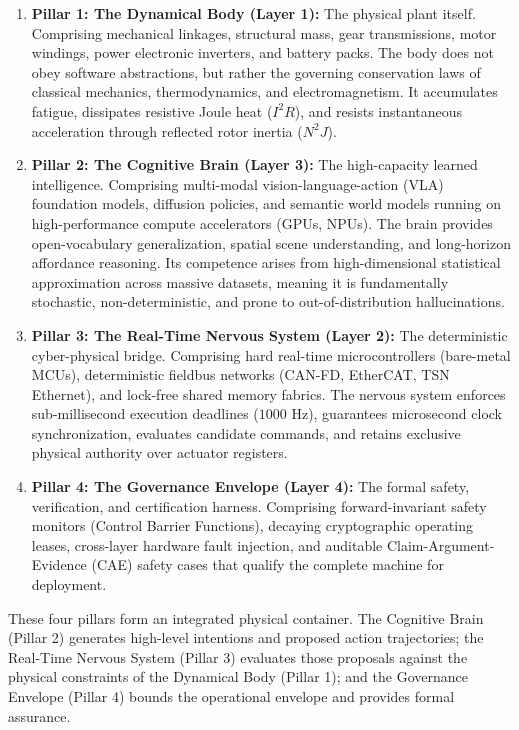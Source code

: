 \documentclass[
  10pt,
  letterpaper,
  twoside,
  openright,
  numbers=noenddot,
  headings=standardclasses
]{scrbook}
\begin{document}
\begin{enumerate}
\def\labelenumi{\arabic{enumi}.}
\tightlist
\item
  \textbf{Pillar 1: The Dynamical Body (Layer 1):} The physical plant
  itself. Comprising mechanical linkages, structural mass, gear
  transmissions, motor windings, power electronic inverters, and battery
  packs. The body does not obey software abstractions, but rather the
  governing conservation laws of classical mechanics, thermodynamics,
  and electromagnetism. It accumulates fatigue, dissipates resistive
  Joule heat (\(I^2 R\)), and resists instantaneous acceleration through
  reflected rotor inertia (\(N^2 J\)).
\item
  \textbf{Pillar 2: The Cognitive Brain (Layer 3):} The high-capacity
  learned intelligence. Comprising multi-modal vision-language-action
  (VLA) foundation models, diffusion policies, and semantic world models
  running on high-performance compute accelerators (GPUs, NPUs). The
  brain provides open-vocabulary generalization, spatial scene
  understanding, and long-horizon affordance reasoning. Its competence
  arises from high-dimensional statistical approximation across massive
  datasets, meaning it is fundamentally stochastic, non-deterministic,
  and prone to out-of-distribution hallucinations.
\item
  \textbf{Pillar 3: The Real-Time Nervous System (Layer 2):} The
  deterministic cyber-physical bridge. Comprising hard real-time
  microcontrollers (bare-metal MCUs), deterministic fieldbus networks
  (CAN-FD, EtherCAT, TSN Ethernet), and lock-free shared memory fabrics.
  The nervous system enforces sub-millisecond execution deadlines
  (\(1000\text{ Hz}\)), guarantees microsecond clock synchronization,
  evaluates candidate commands, and retains exclusive physical authority
  over actuator registers.
\item
  \textbf{Pillar 4: The Governance Envelope (Layer 4):} The formal
  safety, verification, and certification harness. Comprising
  forward-invariant safety monitors (Control Barrier Functions),
  decaying cryptographic operating leases, cross-layer hardware fault
  injection, and auditable Claim-Argument-Evidence (CAE) safety cases
  that qualify the complete machine for deployment.
\end{enumerate}

These four pillars form an integrated physical container. The Cognitive
Brain (Pillar 2) generates high-level intentions and proposed action
trajectories; the Real-Time Nervous System (Pillar 3) evaluates those
proposals against the physical constraints of the Dynamical Body (Pillar
1); and the Governance Envelope (Pillar 4) bounds the operational
envelope and provides formal assurance.
\end{document}
